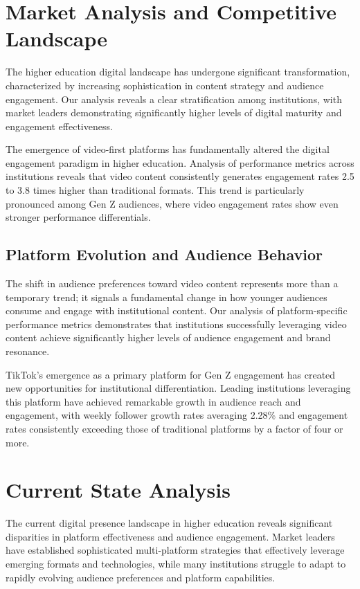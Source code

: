 \documentclass[12pt]{report}
\begin{document}
\chapter{Market Analysis and Competitive Landscape}

The higher education digital landscape has undergone significant transformation, characterized by increasing sophistication in content strategy and audience engagement. Our analysis reveals a clear stratification among institutions, with market leaders demonstrating significantly higher levels of digital maturity and engagement effectiveness.

The emergence of video-first platforms has fundamentally altered the digital engagement paradigm in higher education. Analysis of performance metrics across institutions reveals that video content consistently generates engagement rates 2.5 to 3.8 times higher than traditional formats. This trend is particularly pronounced among Gen Z audiences, where video engagement rates show even stronger performance differentials.

\section{Platform Evolution and Audience Behavior}

The shift in audience preferences toward video content represents more than a temporary trend; it signals a fundamental change in how younger audiences consume and engage with institutional content. Our analysis of platform-specific performance metrics demonstrates that institutions successfully leveraging video content achieve significantly higher levels of audience engagement and brand resonance.

TikTok's emergence as a primary platform for Gen Z engagement has created new opportunities for institutional differentiation. Leading institutions leveraging this platform have achieved remarkable growth in audience reach and engagement, with weekly follower growth rates averaging 2.28\% and engagement rates consistently exceeding those of traditional platforms by a factor of four or more.

\chapter{Current State Analysis}

The current digital presence landscape in higher education reveals significant disparities in platform effectiveness and audience engagement. Market leaders have established sophisticated multi-platform strategies that effectively leverage emerging formats and technologies, while many institutions struggle to adapt to rapidly evolving audience preferences and platform capabilities.
\end{document}
